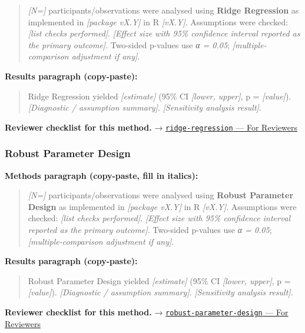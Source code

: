 \documentclass[
]{article}
\begin{document}
\begin{quote}
\emph{{[}N={]}} participants/observations were analysed using
\textbf{Ridge Regression} as implemented in \emph{{[}package vX.Y{]}} in
R \emph{{[}vX.Y{]}}. Assumptions were checked: \emph{{[}list checks
performed{]}}. \emph{{[}Effect size with 95\% confidence interval
reported as the primary outcome{]}}. Two-sided p-values use \emph{α =
0.05}; \emph{{[}multiple-comparison adjustment if any{]}}.
\end{quote}

\textbf{Results paragraph (copy-paste):}

\begin{quote}
Ridge Regression yielded \emph{{[}estimate{]}} (95\% CI \emph{{[}lower,
upper{]}}, p = \emph{{[}value{]}}). \emph{{[}Diagnostic / assumption
summary{]}}. \emph{{[}Sensitivity analysis result{]}}.
\end{quote}

\textbf{Reviewer checklist for this method.} →
\href{../chapters/07-regression/ridge-regression.Rmd\#for-reviewers}{\texttt{ridge-regression}
--- For Reviewers}

\subsubsection{Robust Parameter Design}\label{robust-parameter-design}

\textbf{Methods paragraph (copy-paste, fill in italics):}

\begin{quote}
\emph{{[}N={]}} participants/observations were analysed using
\textbf{Robust Parameter Design} as implemented in \emph{{[}package
vX.Y{]}} in R \emph{{[}vX.Y{]}}. Assumptions were checked: \emph{{[}list
checks performed{]}}. \emph{{[}Effect size with 95\% confidence interval
reported as the primary outcome{]}}. Two-sided p-values use \emph{α =
0.05}; \emph{{[}multiple-comparison adjustment if any{]}}.
\end{quote}

\textbf{Results paragraph (copy-paste):}

\begin{quote}
Robust Parameter Design yielded \emph{{[}estimate{]}} (95\% CI
\emph{{[}lower, upper{]}}, p = \emph{{[}value{]}}). \emph{{[}Diagnostic
/ assumption summary{]}}. \emph{{[}Sensitivity analysis result{]}}.
\end{quote}

\textbf{Reviewer checklist for this method.} →
\href{../chapters/16-design/robust-parameter-design.Rmd\#for-reviewers}{\texttt{robust-parameter-design}
--- For Reviewers}
\end{document}
